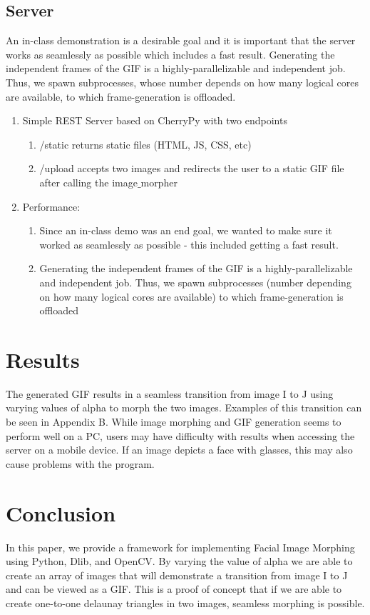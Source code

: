 \documentclass[journal]{IEEEtran}
\begin{document}
\subsection{Server}
	An in-class demonstration is a desirable goal and it is important that the server works as seamlessly as possible which includes a fast result. Generating the independent frames of the GIF is a highly-parallelizable and independent job. Thus, we spawn subprocesses, whose number depends on how many logical cores are available, to which frame-generation is offloaded.
\begin{enumerate}[label=\alph*)]
\item Simple REST Server based on CherryPy with two endpoints
\begin{enumerate}[label=\roman*)]
	\item /static returns static files (HTML, JS, CSS, etc)
	\item /upload accepts two images and redirects the user to a static GIF file after calling the image$\_$morpher
\end{enumerate}

\item Performance:
\begin{enumerate}[label=\roman*)]
	\item Since an in-class demo was an end goal, we wanted to make sure it worked as seamlessly as possible - this included getting a fast result.
	\item Generating the independent frames of the GIF is a highly-parallelizable and independent job. Thus, we spawn subprocesses (number depending on how many logical cores are available) to which frame-generation is offloaded
\end{enumerate}
\end{enumerate}


\section{Results}
	The generated GIF results in a seamless transition from image I to J using varying values of alpha to morph the two images. Examples of this transition can be seen in Appendix B. While image morphing and GIF generation seems to perform well on a PC, users may have difficulty with results when accessing the server on a mobile device. If an image depicts a face with glasses, this may also cause problems with the program.  


\section{Conclusion}
In this paper, we provide a framework for implementing Facial Image Morphing using Python, Dlib, and OpenCV. By varying the value of alpha we are able to create an array of images that will demonstrate a transition from image I to J and can be viewed as a GIF. This is a proof of concept that if we are able to create one-to-one delaunay triangles in two images, seamless morphing is possible.
\end{document}
